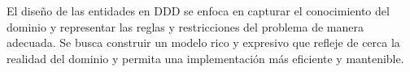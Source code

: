 El diseño de las entidades en DDD se enfoca en capturar el conocimiento del dominio y representar las reglas y
restricciones del problema de manera adecuada. Se busca construir un modelo rico y expresivo que refleje de cerca
la realidad del dominio y permita una implementación más eficiente y mantenible.



